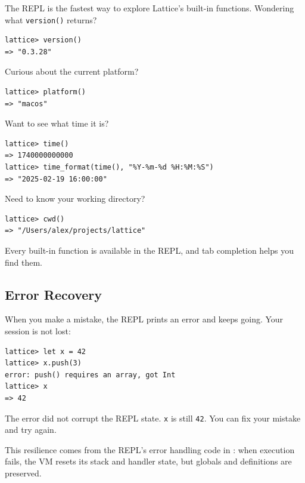 The REPL is the fastest way to explore Lattice's built-in functions.
Wondering what \lstinline|version()| returns?

\begin{lstlisting}[language=Lattice, numbers=none]
lattice> version()
=> "0.3.28"
\end{lstlisting}

Curious about the current platform?

\begin{lstlisting}[language=Lattice, numbers=none]
lattice> platform()
=> "macos"
\end{lstlisting}

Want to see what time it is?

\begin{lstlisting}[language=Lattice, numbers=none]
lattice> time()
=> 1740000000000
lattice> time_format(time(), "%Y-%m-%d %H:%M:%S")
=> "2025-02-19 16:00:00"
\end{lstlisting}

Need to know your working directory?

\begin{lstlisting}[language=Lattice, numbers=none]
lattice> cwd()
=> "/Users/alex/projects/lattice"
\end{lstlisting}

Every built-in function is available in the REPL, and tab completion helps you find them.

\subsection{Error Recovery}\label{subsec:error-recovery}

When you make a mistake, the REPL prints an error and keeps going.
Your session is not lost:

\begin{lstlisting}[language=Lattice, numbers=none]
lattice> let x = 42
lattice> x.push(3)
error: push() requires an array, got Int
lattice> x
=> 42
\end{lstlisting}

The error did not corrupt the REPL state.
\lstinline|x| is still \lstinline|42|.
You can fix your mistake and try again.

This resilience comes from the REPL's error handling code in : when execution fails, the VM resets its stack and handler state, but globals and definitions are preserved.


